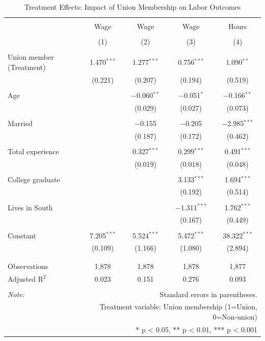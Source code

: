 
\begin{table}[!htbp] \centering 
  \caption{Treatment Effects: Impact of Union Membership on Labor Outcomes} 
  \label{} 
\begin{tabular}{@{\extracolsep{5pt}}lcccc} 
\\[-1.8ex]\hline 
\hline \\[-1.8ex] 
 & Wage & Wage & Wage & Hours \\ 
\\[-1.8ex] & (1) & (2) & (3) & (4)\\ 
\hline \\[-1.8ex] 
 Union member (Treatment) & 1.470$^{***}$ & 1.277$^{***}$ & 0.756$^{***}$ & 1.090$^{**}$ \\ 
  & (0.221) & (0.207) & (0.194) & (0.519) \\ 
  & & & & \\ 
 Age &  & $-$0.060$^{**}$ & $-$0.051$^{*}$ & $-$0.166$^{**}$ \\ 
  &  & (0.029) & (0.027) & (0.073) \\ 
  & & & & \\ 
 Married &  & $-$0.155 & $-$0.205 & $-$2.985$^{***}$ \\ 
  &  & (0.187) & (0.172) & (0.462) \\ 
  & & & & \\ 
 Total experience &  & 0.327$^{***}$ & 0.299$^{***}$ & 0.491$^{***}$ \\ 
  &  & (0.019) & (0.018) & (0.048) \\ 
  & & & & \\ 
 College graduate &  &  & 3.133$^{***}$ & 1.694$^{***}$ \\ 
  &  &  & (0.192) & (0.514) \\ 
  & & & & \\ 
 Lives in South &  &  & $-$1.311$^{***}$ & 1.762$^{***}$ \\ 
  &  &  & (0.167) & (0.449) \\ 
  & & & & \\ 
 Constant & 7.205$^{***}$ & 5.524$^{***}$ & 5.472$^{***}$ & 38.322$^{***}$ \\ 
  & (0.109) & (1.166) & (1.080) & (2.894) \\ 
  & & & & \\ 
\hline \\[-1.8ex] 
Observations & 1,878 & 1,878 & 1,878 & 1,877 \\ 
Adjusted R$^{2}$ & 0.023 & 0.151 & 0.276 & 0.093 \\ 
\hline 
\hline \\[-1.8ex] 
\textit{Note:}  & \multicolumn{4}{r}{Standard errors in parentheses.} \\ 
 & \multicolumn{4}{r}{Treatment variable: Union membership (1=Union, 0=Non-union)} \\ 
 & \multicolumn{4}{r}{* p < 0.05, ** p < 0.01, *** p < 0.001} \\ 
\end{tabular} 
\end{table} 
